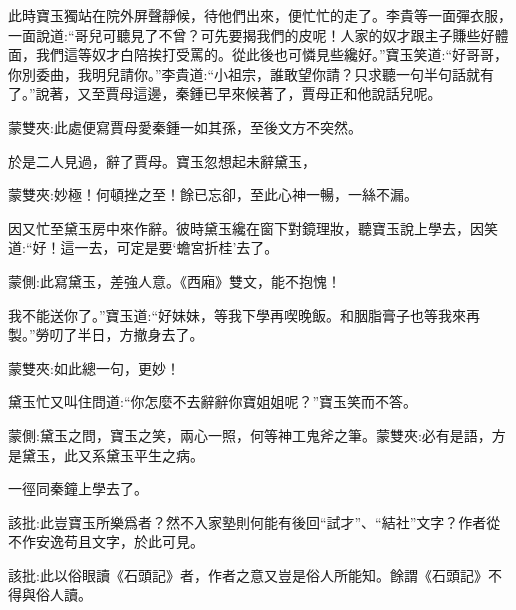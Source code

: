 \begin{parag}
    此時寶玉獨站在院外屏聲靜候，待他們出來，便忙忙的走了。李貴等一面彈衣服，一面說道:“哥兒可聽見了不曾？可先要揭我們的皮呢！人家的奴才跟主子賺些好體面，我們這等奴才白陪挨打受罵的。從此後也可憐見些纔好。”寶玉笑道:“好哥哥，你別委曲，我明兒請你。”李貴道:“小祖宗，誰敢望你請？只求聽一句半句話就有了。”說著，又至賈母這邊，秦鍾已早來候著了，賈母正和他說話兒呢。\begin{note}蒙雙夾:此處便寫賈母愛秦鍾一如其孫，至後文方不突然。\end{note}於是二人見過，辭了賈母。寶玉忽想起未辭黛玉，\begin{note}蒙雙夾:妙極！何頓挫之至！餘已忘卻，至此心神一暢，一絲不漏。\end{note}因又忙至黛玉房中來作辭。彼時黛玉纔在窗下對鏡理妝，聽寶玉說上學去，因笑道:“好！這一去，可定是要‘蟾宮折桂’去了。\begin{note}蒙側:此寫黛玉，差強人意。《西廂》雙文，能不抱愧！\end{note}我不能送你了。”寶玉道:“好妹妹，等我下學再喫晚飯。和胭脂膏子也等我來再製。”勞叨了半日，方撤身去了。\begin{note}蒙雙夾:如此總一句，更妙！\end{note}黛玉忙又叫住問道:“你怎麼不去辭辭你寶姐姐呢？”寶玉笑而不答。\begin{note}蒙側:黛玉之問，寶玉之笑，兩心一照，何等神工鬼斧之筆。蒙雙夾:必有是語，方是黛玉，此又系黛玉平生之病。\end{note}一徑同秦鐘上學去了。\begin{note}該批:此豈寶玉所樂爲者？然不入家塾則何能有後回“試才”、“結社”文字？作者從不作安逸苟且文字，於此可見。\end{note}\begin{note}該批:此以俗眼讀《石頭記》者，作者之意又豈是俗人所能知。餘謂《石頭記》不得與俗人讀。\end{note}
\end{parag}


